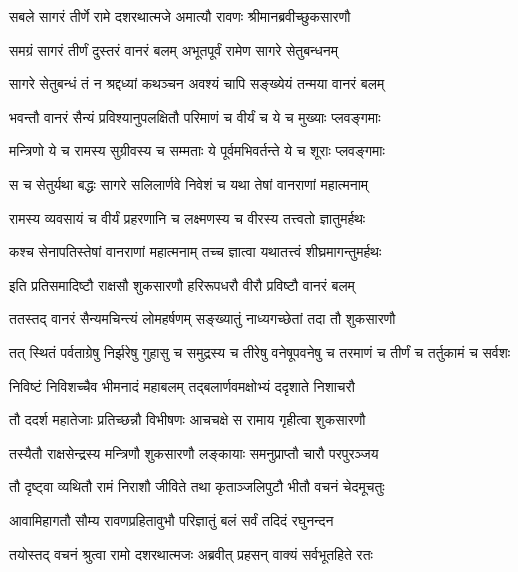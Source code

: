 
\twolineshloka
{सबले सागरं तीर्णे रामे दशरथात्मजे}
{अमात्यौ रावणः श्रीमानब्रवीच्छुकसारणौ} %

\twolineshloka
{समग्रं सागरं तीर्णं दुस्तरं वानरं बलम्}
{अभूतपूर्वं रामेण सागरे सेतुबन्धनम्} %

\twolineshloka
{सागरे सेतुबन्धं तं न श्रद्दध्यां कथञ्चन}
{अवश्यं चापि सङ्ख्येयं तन्मया वानरं बलम्} %

\twolineshloka
{भवन्तौ वानरं सैन्यं प्रविश्यानुपलक्षितौ}
{परिमाणं च वीर्यं च ये च मुख्याः प्लवङ्गमाः} %

\twolineshloka
{मन्त्रिणो ये च रामस्य सुग्रीवस्य च सम्मताः}
{ये पूर्वमभिवर्तन्ते ये च शूराः प्लवङ्गमाः} %

\twolineshloka
{स च सेतुर्यथा बद्धः सागरे सलिलार्णवे}
{निवेशं च यथा तेषां वानराणां महात्मनाम्} %

\twolineshloka
{रामस्य व्यवसायं च वीर्यं प्रहरणानि च}
{लक्ष्मणस्य च वीरस्य तत्त्वतो ज्ञातुमर्हथः} %

\twolineshloka
{कश्च सेनापतिस्तेषां वानराणां महात्मनाम्}
{तच्च ज्ञात्वा यथातत्त्वं शीघ्रमागन्तुमर्हथः} %

\twolineshloka
{इति प्रतिसमादिष्टौ राक्षसौ शुकसारणौ}
{हरिरूपधरौ वीरौ प्रविष्टौ वानरं बलम्} %

\twolineshloka
{ततस्तद् वानरं सैन्यमचिन्त्यं लोमहर्षणम्}
{सङ्ख्यातुं नाध्यगच्छेतां तदा तौ शुकसारणौ} %

\threelineshloka
{तत् स्थितं पर्वताग्रेषु निर्झरेषु गुहासु च}
{समुद्रस्य च तीरेषु वनेषूपवनेषु च}
{तरमाणं च तीर्णं च तर्तुकामं च सर्वशः} %

\twolineshloka
{निविष्टं निविशच्चैव भीमनादं महाबलम्}
{तद्बलार्णवमक्षोभ्यं ददृशाते निशाचरौ} %

\twolineshloka
{तौ ददर्श महातेजाः प्रतिच्छन्नौ विभीषणः}
{आचचक्षे स रामाय गृहीत्वा शुकसारणौ} %

\twolineshloka
{तस्यैतौ राक्षसेन्द्रस्य मन्त्रिणौ शुकसारणौ}
{लङ्कायाः समनुप्राप्तौ चारौ परपुरञ्जय} %

\twolineshloka
{तौ दृष्ट्वा व्यथितौ रामं निराशौ जीविते तथा}
{कृताञ्जलिपुटौ भीतौ वचनं चेदमूचतुः} %

\twolineshloka
{आवामिहागतौ सौम्य रावणप्रहितावुभौ}
{परिज्ञातुं बलं सर्वं तदिदं रघुनन्दन} %

\twolineshloka
{तयोस्तद् वचनं श्रुत्वा रामो दशरथात्मजः}
{अब्रवीत् प्रहसन् वाक्यं सर्वभूतहिते रतः} %

